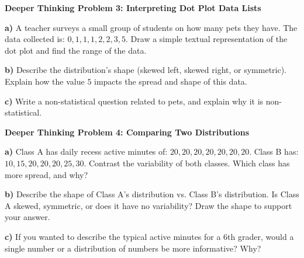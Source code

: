 \documentclass[12pt, letterpaper, fleqn]{article}
\begin{document}
\begin{tcolorbox}[colback=white, colframe=black, boxrule=1pt, arc=4mm, left=6mm, right=6mm, top=5mm, bottom=5mm]
\textbf{Deeper Thinking Problem 3: Interpreting Dot Plot Data Lists}

\medskip

\noindent
\textbf{a)} A teacher surveys a small group of students on how many pets they have. The data collected is: $0, 1, 1, 1, 2, 2, 3, 5$. Draw a simple textual representation of the dot plot and find the range of the data.

\vspace{6cm}

\noindent
\textbf{b)} Describe the distribution's shape (skewed left, skewed right, or symmetric). Explain how the value $5$ impacts the spread and shape of this data.

\vspace{6cm}

\noindent
\textbf{c)} Write a non-statistical question related to pets, and explain why it is non-statistical.

\vspace{4cm}
\end{tcolorbox}
\newpage

\begin{tcolorbox}[colback=white, colframe=black, boxrule=1pt, arc=4mm, left=6mm, right=6mm, top=5mm, bottom=5mm]
\textbf{Deeper Thinking Problem 4: Comparing Two Distributions}

\medskip

\noindent
\textbf{a)} Class A has daily recess active minutes of: $20, 20, 20, 20, 20, 20, 20$. Class B has: $10, 15, 20, 20, 20, 25, 30$. Contrast the variability of both classes. Which class has more spread, and why?

\vspace{5cm}

\noindent
\textbf{b)} Describe the shape of Class A's distribution vs. Class B's distribution. Is Class A skewed, symmetric, or does it have no variability? Draw the shape to support your answer.

\vspace{5.0cm}

\noindent
\textbf{c)} If you wanted to describe the typical active minutes for a 6th grader, would a single number or a distribution of numbers be more informative? Why?

\vspace{5cm}
\end{tcolorbox}
\end{document}
